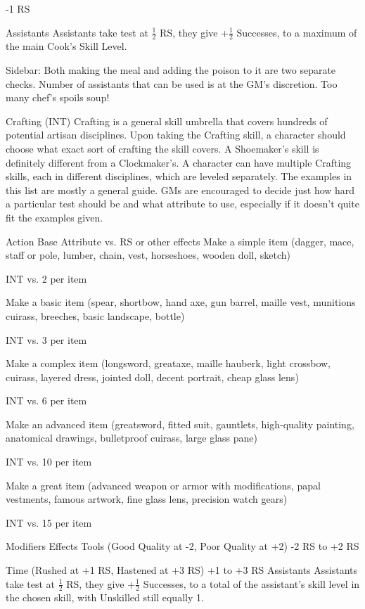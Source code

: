 \documentclass[oneside,11pt,english]{book}
\begin{document}
-1 RS 

Assistants Assistants take test at $ \frac{1}{2} $ RS, they give +$ \frac{1}{2} $ Successes, to a maximum 
of the main Cook’s Skill Level. 

 
Sidebar: 
Both making the meal and adding the poison to it are two separate checks. 
Number of assistants that can be used is at the GM’s discretion. Too many chef’s spoils soup! 

 

Crafting (INT) 
Crafting is a general skill umbrella that covers hundreds of potential artisan disciplines. Upon taking the 
Crafting skill, a character should choose what exact sort of crafting the skill covers. A Shoemaker’s skill 
is definitely different from a Clockmaker’s. A character can have multiple Crafting skills, each in 
different disciplines, which are leveled separately. 
The examples in this list are mostly a general guide. GMs are encouraged to decide just how hard a 
particular test should be and what attribute to use, especially if it doesn’t quite fit the examples given. 

 

Action Base Attribute vs. RS or other effects 
Make a simple item (dagger, mace, staff or pole, 
lumber, chain, vest, horseshoes, wooden doll, sketch) 

INT vs. 2 per item 

Make a basic item (spear, shortbow, hand axe, gun 
barrel, maille vest, munitions cuirass, breeches, basic 
landscape, bottle) 

INT vs. 3 per item 

Make a complex item (longsword, greataxe, maille 
hauberk, light crossbow, cuirass, layered dress, 
jointed doll, decent portrait, cheap glass lens) 

INT vs. 6 per item 

Make an advanced item (greatsword, fitted suit, 
gauntlets, high-quality painting, anatomical drawings, 
bulletproof cuirass, large glass pane) 

INT vs. 10 per item 

Make a great item (advanced weapon or armor with 
modifications, papal vestments, famous artwork, fine 
glass lens, precision watch gears) 

INT vs. 15 per item 

Modifiers Effects 
Tools (Good Quality at -2, Poor Quality at +2) -2 RS to +2 RS 


Time (Rushed at +1 RS, Hastened at +3 RS) +1 to +3 RS 
Assistants Assistants take test at $ \frac{1}{2} $ RS, they give +$ \frac{1}{2} $
Successes, to a total of the assistant’s skill level 
in the chosen skill, with Unskilled still equally 1. 
\end{document}
